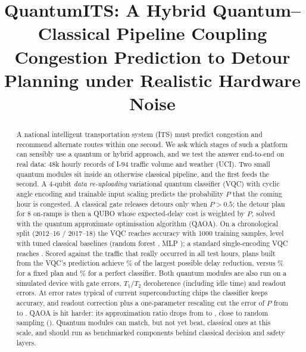 \documentclass[conference]{IEEEtran}
\begin{document}
\title{QuantumITS: A Hybrid Quantum--Classical Pipeline Coupling Congestion Prediction to Detour Planning under Realistic Hardware Noise}

\author{
\and
{}
}

\maketitle

\begin{abstract}
A national intelligent transportation system (ITS) must predict congestion and recommend alternate routes within one second. We ask which stages of such a platform can sensibly use a quantum or hybrid approach, and we test the answer end-to-end on real data: 48k hourly records of I-94 traffic volume and weather (UCI). Two small quantum modules sit inside an otherwise classical pipeline, and the first feeds the second. A 4-qubit \emph{data re-uploading} variational quantum classifier (VQC) with cyclic angle encoding and trainable input scaling predicts the probability $P$ that the coming hour is congested. A classical gate releases detours only when $P>0.5$; the detour plan for 8 on-ramps is then a QUBO whose expected-delay cost is weighted by $P$, solved with the quantum approximate optimisation algorithm (QAOA). On a chronological split (2012--16 / 2017--18) the VQC reaches \accOursM{} accuracy with 1000 training samples, level with tuned classical baselines (random forest \accRFM{}, MLP \accMLPM{}); a standard single-encoding VQC reaches \accStdM{}. Scored against the traffic that really occurred in all \eeHours{} test hours, plans built from the VQC's prediction achieve \eeOurs\% of the largest possible delay reduction, versus \eeAlways\% for a fixed plan and \eeLabel\% for a perfect classifier. Both quantum modules are also run on a simulated device with gate errors, $T_1/T_2$ decoherence (including idle time) and readout errors. At error rates typical of current superconducting chips the classifier keeps \nzMitOne{} accuracy, and readout correction plus a one-parameter rescaling cut the error of $P$ from \nzErrRawOne{} to \nzErrMitOne. QAOA is hit harder: its approximation ratio drops from \qnArZero{} to \qnArOne, close to random sampling (\arR). Quantum modules can match, but not yet beat, classical ones at this scale, and should run as benchmarked components behind classical decision and safety layers.
\end{abstract}
\end{document}
